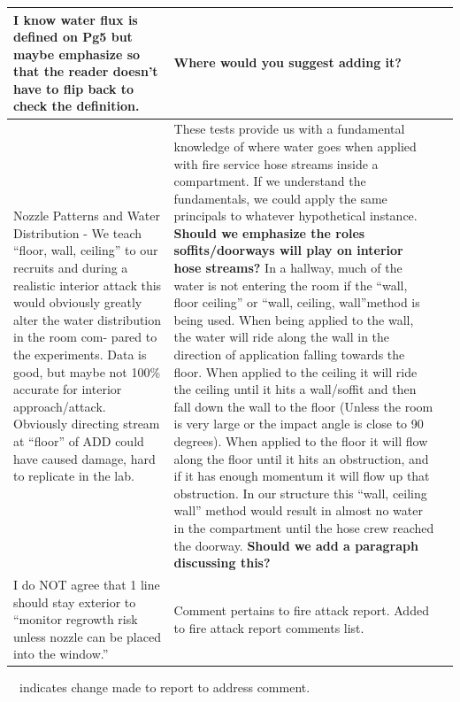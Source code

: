 \documentclass[12pt,oneside]{book}
\begin{document}
\begin{landscape}
\begin{longtable}{|L{4in}|L{3.75in}|c|}
 		\hline
 		I know water flux is defined on Pg5 but maybe emphasize so that the reader doesn't have to flip back to check the definition. &
 		\textbf{Where would you suggest adding it?} & \\

 		\hline
 		Nozzle Patterns and Water Distribution - We teach ``floor, wall, ceiling'' to our recruits and during a realistic interior attack this would obviously greatly alter the water distribution in the room com- pared to the experiments. Data is good, but maybe not 100\% accurate for interior approach/attack. Obviously directing stream at ``floor'' of ADD could have caused damage, hard to replicate in the lab. & 
 		These tests provide us with a fundamental knowledge of where water goes when applied with fire service hose streams inside a compartment. If we understand the fundamentals, we could apply the same principals to whatever hypothetical instance. \textbf{Should we emphasize the roles soffits/doorways will play on interior hose streams?} In a hallway, much of the water is not entering the room if the ``wall, floor ceiling'' or ``wall, ceiling, wall''method is being used. When being applied to the wall, the water will ride along the wall in the direction of application falling towards the floor. When applied to the ceiling it will ride the ceiling until it hits a wall/soffit and then fall down the wall to the floor (Unless the room is very large or the impact angle is close to 90 degrees). When applied to the floor it will flow along the floor until it hits an obstruction, and if it has enough momentum it will flow up that obstruction. In our structure this ``wall, ceiling wall'' method would result in almost no water in the compartment until the hose crew reached the doorway.  \textbf{Should we add a paragraph discussing this?} & \\

 		\hline
 		I do NOT agree that 1 line should stay exterior to ``monitor regrowth risk unless nozzle can be placed into the window.'' &
 		Comment pertains to fire attack report. Added to fire attack report comments list. & \\

 		\hline
\end{longtable}
\checkmark~~indicates change made to report to address comment.

\end{landscape}

\pagestyle{plain}

\end{document}
